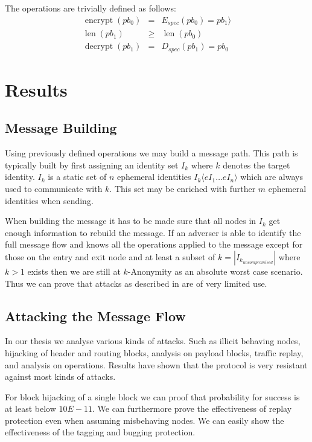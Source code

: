 \documentclass[9pt,journal,compsoc]{IEEEtran}
\DeclareMathOperator{\len}{len}
\DeclareMathOperator{\encrypt}{encrypt}
\DeclareMathOperator{\decrypt}{decrypt}
\begin{document}
The operations are trivially defined as follows:
\begin{eqnarray}
\encrypt(pb_0) & = &E_{spec}(pb_0) =pb_1 \rangle\\
\len(pb_1) & \geq & \len(pb_0)\\
\decrypt(pb_1) & = &D_{spec}(pb_1)= pb_0
\end{eqnarray}

\section{Results}
\subsection{Message Building}
Using previously defined operations we may build a message path. This path is typically built by first assigning an identity set $I_k$ where  $k$ denotes the target identity. $I_k$ is a static set of $n$ ephemeral identities $I_k\langle eI_1 \ldots eI_n\rangle$ which are always used to communicate with $k$. This set may be enriched with further $m$ ephemeral identities when sending. 

When building the message it has to be made sure that all nodes in $I_k$ get enough information to rebuild the message. If an adverser is able to identify the full message flow and knows all the operations applied to the message except for those on the entry and exit node and at least a subset of $k=|I_{k_{uncompromised}}|$ where $k>1$ exists then we are still at $k$-Anonymity as an absolute worst case scenario. Thus we can prove that attacks as described in \cite{DanSer04} are of very limited use.

\subsection{Attacking the Message Flow}
In our thesis\cite{messageVortex} we analyse various kinds of attacks. Such as illicit behaving nodes, hijacking of header and routing blocks, analysis on payload blocks, traffic replay, and analysis on operations. Results have shown that the protocol is very resistant against most kinds of attacks.

For block hijacking of a single block we can proof that probability for success is at least below $10E-11$. We can furthermore prove the effectiveness of replay protection even when assuming misbehaving nodes. We can easily show the effectiveness of the tagging and bugging protection. 
\end{document}
